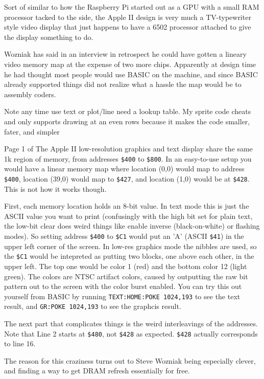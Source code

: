 \documentclass{article}
\begin{document}
Sort of similar to how the Raspberry Pi started out as a GPU with a small
RAM processor tacked to the side, the Apple II design is very much
a TV-typewriter style video display that just happens to have a 6502
processor attached to give the display something to do.

Wozniak has said in an interview in retrospect he could have
gotten a lineary video memory map at the expense of two more chips.
Apparently at design time he had thought most people would use BASIC
on the machine, and since BASIC already supported things did not realize
what a hassle the map would be to assembly coders.

Note any time use text or plot/line need a lookup table.
My sprite code cheats and only supports drawing at an even rows because
it makes the code smaller, fater, and simpler





Page 1 of The Apple II low-resolution graphics and text display share
the same 1k region of memory, from addresses {\tt \$400} to  {\tt \$800}.
In an easy-to-use setup you would have a linear memory map where
location (0,0) would map to address {\tt \$400}, location (39,0) would map
to {\tt \$427}, and location (1,0) would be at {\tt \$428}.
This is not how it works though.

First, each memory location holds an 8-bit value. 
In text mode this is just the ASCII value you want to print 
(confusingly with the high bit set for plain text, the low-bit clear
does weird things like enable inverse (black-on-white) or flashing
modes).
So setting address {\tt \$400} to {\tt \$C1}
would put an 'A' (ASCII {\tt \$41})
in the upper left corner of the screen.
In low-res graphics mode the nibbles are used, so the {\tt \$C1} would
be intepreted as putting two blocks, one above each other, in the upper
left.
The top one would be color 1 (red) and the bottom color 12 (light green).
The colors are NTSC artifact colors, caused by outputting the raw bit
pattern out to the screen with the color burst enabled.
You can try this out yourself from BASIC by running 
{\tt TEXT:HOME:POKE 1024,193} to see the text result, and
{\tt GR:POKE 1024,193} to see the graphcis result.

The next part that complicates things is the weird interleavings of
the addresses.
Note that Line 2 starts at {\tt \$480}, not {\tt \$428} as expected.
{\tt \$428} actually corresponds to line 16.

The reason for this craziness turns out to Steve Wozniak being especially 
clever, and finding a way to get DRAM refresh essentially for free.
\end{document}
